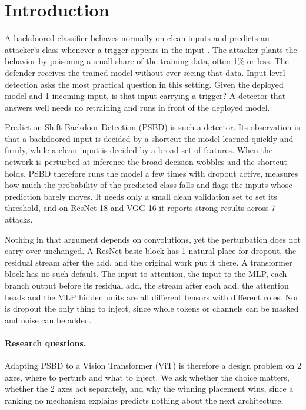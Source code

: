 \section{Introduction}
\label{sec:intro}

A backdoored classifier behaves normally on clean inputs and predicts an
attacker's class whenever a trigger appears in the input
\cite{li2022backdoorsurvey}. The attacker plants the behavior by poisoning a
small share of the training data, often 1\% or less. The defender receives the
trained model without ever seeing that data. Input-level detection asks the
most practical question in this setting. Given the deployed model and 1 incoming
input, is that input carrying a trigger? A detector that answers well needs no
retraining and runs in front of the deployed model.

Prediction Shift Backdoor Detection (PSBD) \cite{li2025psbd} is such a detector.
Its observation is that a backdoored input is decided by a shortcut the model
learned quickly and firmly, while a clean input is decided by a broad set of
features. When the network is perturbed at inference the broad decision wobbles
and the shortcut holds. PSBD therefore runs the model a few times with dropout
active, measures how much the probability of the predicted class falls and flags
the inputs whose prediction barely moves. It needs only a small clean validation
set to set its threshold, and on ResNet-18 and VGG-16 it reports strong results
across 7 attacks.

Nothing in that argument depends on convolutions, yet the perturbation does not
carry over unchanged. A ResNet basic block has 1 natural place for dropout, the
residual stream after the add, and the original work put it there. A transformer
block has no such default. The input to attention, the input to the MLP, each
branch output before its residual add, the stream after each add, the attention
heads and the MLP hidden units are all different tensors with different roles.
Nor is dropout the only thing to inject, since whole tokens or channels can be
masked and noise can be added.

\paragraph{Research questions.} Adapting PSBD to a Vision Transformer (ViT)
\cite{dosovitskiy2021an} is therefore a design problem on 2 axes, where to
perturb and what to inject. We ask whether the choice matters, whether the 2
axes act separately, and why the winning placement wins, since a ranking no
mechanism explains predicts nothing about the next architecture.


